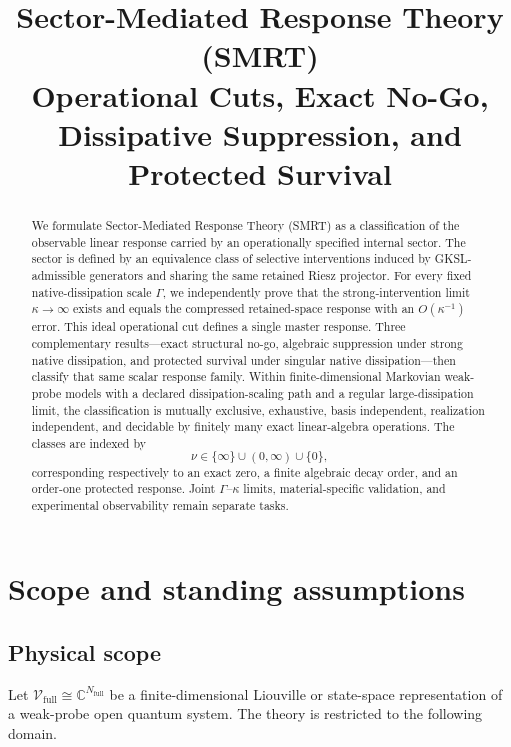 \documentclass[11pt]{article}
\title{Sector-Mediated Response Theory (SMRT)\\
\large Operational Cuts, Exact No-Go, Dissipative Suppression, and Protected Survival}
\author{}
\date{}
\theoremstyle{definition}
\theoremstyle{remark}
\theoremstyle{plain}
\newcommand{\V}{\mathcal V}
\newcommand{\C}{\mathbb C}
\newcommand{\full}{\mathrm{full}}
\begin{document}
\maketitle

\begin{abstract}
We formulate Sector-Mediated Response Theory (SMRT) as a classification of the observable linear response carried by an operationally specified internal sector.  The sector is defined by an equivalence class of selective interventions induced by GKSL-admissible generators and sharing the same retained Riesz projector.  For every fixed native-dissipation scale $\Gamma$, we independently prove that the strong-intervention limit $\kappa\to\infty$ exists and equals the compressed retained-space response with an $O(\!\kappa^{-1})$ error.  This ideal operational cut defines a single master response.  Three complementary results---exact structural no-go, algebraic suppression under strong native dissipation, and protected survival under singular native dissipation---then classify that same scalar response family.  Within finite-dimensional Markovian weak-probe models with a declared dissipation-scaling path and a regular large-dissipation limit, the classification is mutually exclusive, exhaustive, basis independent, realization independent, and decidable by finitely many exact linear-algebra operations.  The classes are indexed by
\[
  \nu\in\{\infty\}\cup(0,\infty)\cup\{0\},
\]
corresponding respectively to an exact zero, a finite algebraic decay order, and an order-one protected response.  Joint $\Gamma$--$\kappa$ limits, material-specific validation, and experimental observability remain separate tasks.
\end{abstract}

\tableofcontents

\section{Scope and standing assumptions}

\subsection{Physical scope}
Let $\V_{\full}\cong\C^{N_{\full}}$ be a finite-dimensional Liouville or state-space representation of a weak-probe open quantum system.  The theory is restricted to the following domain.
\end{document}
